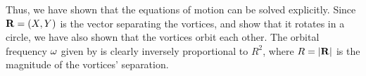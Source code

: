\begin{solution}
	Thus, we have shown that the equations of motion can be solved explicitly.  Since $\mathbf{R} = (X, Y)$ is the vector separating the vortices, and  show that it rotates in a circle, we have also shown that the vortices orbit each other.  The orbital frequency $\omega$ given by  is clearly inversely proportional to $R^2$, where $R = |\mathbf{R}|$ is the magnitude of the vortices' separation.
\end{solution}